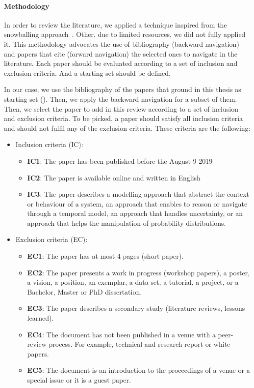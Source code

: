 \paragraph{Methodology}
In order to review the literature, we applied a technique inspired from the snowballing approach~\cite{DBLP:conf/ease/Wohlin14}.
Other, due to limited resources, we did not fully applied it.
This methodology advocates the use of bibliography (backward navigation) and papers that cite (forward navigation) the selected ones to navigate in the literature.
Each paper should be evaluated according to a set of inclusion and exclusion criteria.
And a starting set should be defined.

In our case, we use the bibliography of the papers that ground in this thesis as starting set (\cf {}).
Then, we apply the backward navigation for a subset of them.
Then, we select the paper to add in this review according to a set of inclusion and exclusion criteria.
To be picked, a paper should satisfy all inclusion criteria and should not fulfil any of the exclusion criteria.
These criteria are the following:
\begin{itemize}
	\item Inclusion criteria (IC):
	\begin{itemize}
		\item \textbf{IC1}: The paper has been published before the August 9 2019
		\item \textbf{IC2}: The paper is available online and written in English
		\item \textbf{IC3}: The paper describes a modelling approach that abstract the context or \gls{behaviour} of a system, an approach that enables to reason or navigate through a temporal model, an approach that handles uncertainty, or an approach that helps the manipulation of probability distributions. 
	\end{itemize}
	\item Exclusion criteria (EC):
	\begin{itemize}
		\item \textbf{EC1}: The paper has at most 4 pages (short paper).
		\item \textbf{EC2}: The paper presents a work in progress (workshop papers), a poster, a vision, a position, an exemplar, a data set, a tutorial, a project, or a Bachelor, Master or PhD dissertation.
		\item \textbf{EC3}: The paper describes a secondary study (\eg literature reviews, lessons learned).
		\item \textbf{EC4}: The document has not been published in a venue with a peer-review process. For example, technical and research report or white papers.
		\item \textbf{EC5}: The document is an introduction to the proceedings of a venue or a special issue or it is a guest paper.
	\end{itemize}
\end{itemize}

